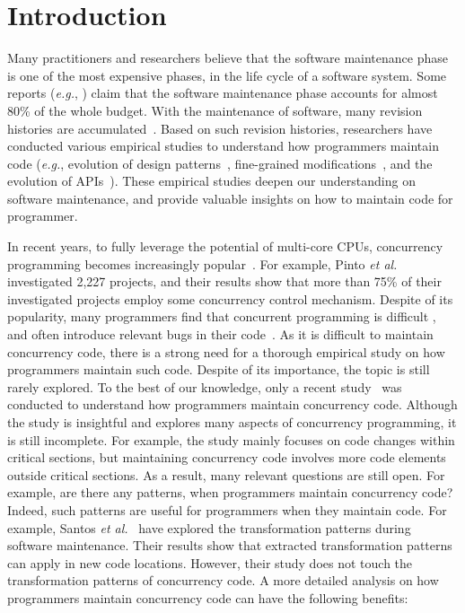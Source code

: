 \section{Introduction}
Many practitioners and researchers believe that the software maintenance phase is one of the most expensive phases, in the life cycle of a software system. Some reports (\emph{e.g.}, \cite{ahn2003software}) claim that the software maintenance phase accounts for almost 80\% of the whole budget. With the maintenance of software, many revision histories are accumulated~\cite{conf/icsm/Borges16}. Based on such revision histories, researchers have conducted various empirical studies to understand how programmers maintain code (\emph{e.g.}, evolution of design patterns~\cite{aversano2007empirical}, fine-grained modifications~\cite{german2006empirical}, and the evolution of APIs~\cite{mcdonnell2013empirical}). These empirical studies deepen our understanding on software maintenance, and provide valuable insights on how to maintain code for programmer.



In recent years, to fully leverage the potential of multi-core CPUs, concurrency programming becomes increasingly popular~\cite{journals/jss/PintoTFFB15}. For example, Pinto \emph{et al.}~\cite{journals/jss/PintoTFFB15} investigated 2,227 projects, and their results show that more than 75\% of their investigated projects employ some concurrency control mechanism. Despite of its popularity, many programmers find that concurrent programming is difficult \cite{journals/corr/McKenney17}, and often introduce relevant bugs in their code~\cite{conf/asplos/LuPSZ08}. As it is difficult to maintain concurrency code, there is a strong need for a thorough empirical study on how programmers maintain such code. Despite of its importance, the topic is still rarely explored. To the best of our knowledge, only a recent study~\cite{conf/sigsoft/GuJSZL15} was conducted to understand how programmers maintain concurrency code. Although the study is insightful and explores many aspects of concurrency programming, it is still incomplete. For example, the study mainly focuses on code changes within critical sections, but maintaining concurrency code involves more code elements outside critical sections. As a result, many relevant questions are still open. For example, are there any patterns, when programmers maintain concurrency code? Indeed, such patterns are useful for programmers when they maintain code. For example, Santos \emph{et al.}~\cite{conf/icsm/SantosAEDV15} have explored the transformation patterns during software maintenance. Their results show that extracted transformation patterns can apply in new code locations. However, their study does not touch the transformation patterns of concurrency code. A more detailed analysis on how programmers maintain concurrency code can have the following benefits:




